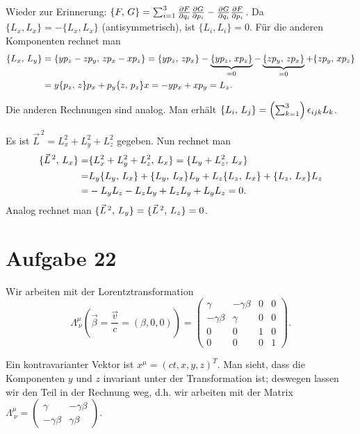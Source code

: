 Wieder zur Erinnerung: 
$\{ F, \, G \} = \sum^3_{i = 1} \frac{\partial F}{\partial q_i} \frac{\partial G}{\partial p_i} - \frac{\partial G}{\partial q_i} \frac{\partial F}{\partial p_i}$. Da $\{ L_x, L_x \} = - \{ L_x, L_x \}$ (antisymmetrisch), ist $\{ L_i, L_i \} = 0$. Für die anderen Komponenten rechnet man
\begin{align*}
	\{ L_x, \, L_y \}
	&= \{ y p_z - z p_y, \, z p_x - x p_z \}
	= \{ y p_z, \, z p_x \} - \underbrace{\{ y p_z, \, x p_z \}}_{= 0} - \underbrace{\{ z p_y, \, z p_x \}}_{= 0} + \{ z p_y, \, x p_z \} \\
	&= y \{ p_z, \, z \} p_x + p_y \{ z, \, p_z \} x = - y p_x + x p_y = L_z
	\text{.}
\end{align*}

Die anderen Rechnungen sind analog. Man erhält $\{ L_i, \, L_j \} = \left( \sum^3_{k = 1} \right) \epsilon_{ijk} L_k$.

Es ist $\vec{L}^{\,2} = L_x^2 + L_y^2 + L_z^2$ gegeben. Nun rechnet man
\begin{align*}
	\{ \vec{L}^{\,2}, \, L_x \} 
	=& \{ L_x^2 + L_y^2 + L_z^2, \, L_x \}
	= \{ L_y + L_z^2, \, L_x \}	 \\
	=& L_y \{ L_y, \, L_x \} + \{ L_y, \, L_x \} L_y + L_z \{ L_z, \, L_x \} + \{ L_z, \, L_x \} L_z \\
	=& -L_y L_z - L_z L_y + L_z L_y + L_y L_z = 0 \text{.}
\end{align*}
Analog rechnet man $\{ \vec{L}^{\,2}, \, L_y \} = \{ \vec{L}^{\,2}, \, L_z \} = 0$.

\section*{Aufgabe 22}

Wir arbeiten mit der Lorentztransformation 
\[
	\Lambda_{~\nu}^\mu \left( \vec{\beta} = \frac{\vec{v}}{c} = (\beta, 0, 0) \right) = 
	\begin{pmatrix}
		\gamma & - \gamma \beta & 0 & 0 \\
		- \gamma \beta & \gamma & 0 & 0 \\
		0 & 0 & 1 & 0 \\
		0 & 0 & 0 & 1
	\end{pmatrix}
	\text{.}
\]

Ein kontravarianter Vektor ist $x^\mu = (ct, x, y, z)^T$. Man sieht, dass die Komponenten $y$ und $z$ invariant unter der Transformation ist; deswegen lassen wir den Teil in der Rechnung weg, d.h. wir arbeiten mit der Matrix $\Lambda_{~\nu}^\mu = \begin{pmatrix}
		\gamma & - \gamma \beta \\
		- \gamma \beta & \gamma \beta
	\end{pmatrix}$.
	
